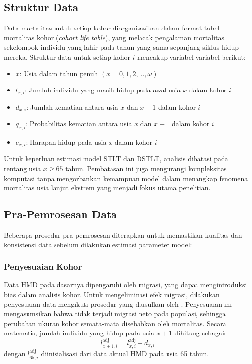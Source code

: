 \subsection{Struktur Data}

Data mortalitas untuk setiap kohor diorganisasikan dalam format tabel mortalitas kohor (\textit{cohort life table}), yang melacak pengalaman mortalitas sekelompok individu yang lahir pada tahun yang sama sepanjang siklus hidup mereka. Struktur data untuk setiap kohor $i$ mencakup variabel-variabel berikut:

\begin{itemize}
    \item $x$: Usia dalam tahun penuh $(x = 0, 1, 2, \ldots, \omega)$
    \item $l_{x,i}$: Jumlah individu yang masih hidup pada awal usia $x$ dalam kohor $i$
    \item $d_{x,i}$: Jumlah kematian antara usia $x$ dan $x+1$ dalam kohor $i$
    \item $q_{x,i}$: Probabilitas kematian antara usia $x$ dan $x+1$ dalam kohor $i$
    \item $e_{x,i}$: Harapan hidup pada usia $x$ dalam kohor $i$
\end{itemize}

Untuk keperluan estimasi model STLT dan DSTLT, analisis dibatasi pada rentang usia $x \geq 65$ tahun. Pembatasan ini juga mengurangi kompleksitas komputasi tanpa mengorbankan kemampuan model dalam menangkap fenomena mortalitas usia lanjut ekstrem yang menjadi fokus utama penelitian.


\subsection{Pra-Pemrosesan Data}

Beberapa prosedur pra-pemrosesan diterapkan untuk memastikan kualitas dan konsistensi data sebelum dilakukan estimasi parameter model:

\subsubsection{Penyesuaian Kohor}
Data HMD pada dasarnya dipengaruhi oleh migrasi, yang dapat mengintroduksi bias dalam analisis kohor. Untuk mengeliminasi efek migrasi, dilakukan penyesuaian data mengikuti prosedur yang diusulkan oleh \citet{Huang2020}. Penyesuaian ini mengasumsikan bahwa tidak terjadi migrasi neto pada populasi, sehingga perubahan ukuran kohor semata-mata disebabkan oleh mortalitas. Secara matematis, jumlah individu yang hidup pada usia $x+1$ dihitung sebagai:
\begin{equation}
l_{x+1,i}^{\text{adj}} = l_{x,i}^{\text{adj}} - d_{x,i}
\end{equation}
dengan $l_{65,i}^{\text{adj}}$ diinisialisasi dari data aktual HMD pada usia 65 tahun.

